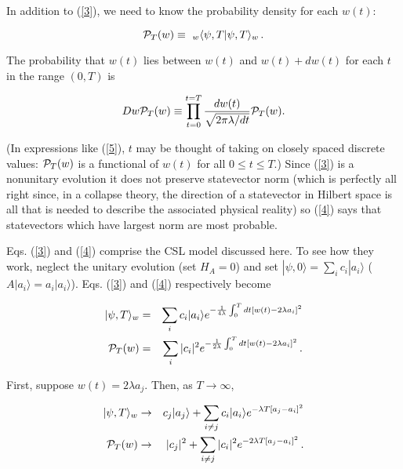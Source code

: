 \documentclass[12pt]{article}
\begin{document}
	In addition to (\ref{3}), we need to know the 
probability density for each $w(t)$: 

\begin{equation}\label{4}
	{\cal P}_{T}(w)\equiv
	\ _{w}\langle\psi,T|\psi,T\rangle_{w}\, .
\end{equation}

\noindent The probability that $w(t)$ lies between $w(t)$ and $w(t)+dw(t)$ 
for each $t$ in the range $(0,T)$ is 

\begin{equation}\label{5}
	Dw{\cal P}_{T}(w)\equiv
	\prod_{t=0}^{t=T}\frac{dw(t)}{\sqrt{2\pi\lambda/dt}}{\cal P}_{T}(w).
\end{equation}

\noindent (In expressions like (\ref{5}), $t$ may be thought of taking on closely 
spaced discrete values: ${\cal P}_{T}(w)$ is a functional of $w(t)$ for all $0\leq t\leq T$.)  
Since (\ref{3}) is a nonunitary evolution it does not 
preserve statevector norm (which is perfectly all right since, in a collapse theory, 
the direction of a statevector in Hilbert space is all that is needed to 
describe the associated physical reality) so (\ref{4}) says that 
statevectors which have largest norm are most probable.  

	Eqs. (\ref{3}) and (\ref{4}) comprise the CSL model discussed here.  
To see how they work, neglect the unitary evolution (set $H_{A}=0$) and 
set $|\psi,0\rangle=\sum_{i}c_{i}|a_{i}\rangle$ 
($A|a_{i}\rangle=a_{i}|a_{i}\rangle$).  Eqs. (\ref{3}) and (\ref{4}) respectively become 

\begin{eqnarray*}
	|\psi,T\rangle_{w}&
	=&\sum_{i}c_{i}|a_{i}\rangle e^{-\frac{1}{4\lambda}\int_{0}^{T}
 dt[w(t)-2\lambda a_{i}]^{2}}\\
	{\cal P}_{T}(w)&
	=&\sum_{i}|c_{i}|^{2}e^{-\frac{1}{2\lambda}\int_{0}^{T}
 dt[w(t)-2\lambda a_{i}]^{2}}\, .
\end{eqnarray*}

\noindent First, suppose $w(t)=2\lambda a_{j}$.  Then, as $T\rightarrow\infty$,

\begin{eqnarray*}
	|\psi,T\rangle_{w}&\rightarrow &c_{j}|a_{j}\rangle +
	\sum_{i\neq j}c_{i}|a_{i}\rangle e^{-\lambda T [a_{j}-a_{i}]^{2}}\\
	{\cal P}_{T}(w)&\rightarrow &|c_{j}|^{2}+
	\sum_{i\neq j}|c_{i}|^{2} e^{-2\lambda T [a_{j}-a_{i}]^{2}}\, . 
\end{eqnarray*}
\end{document}
